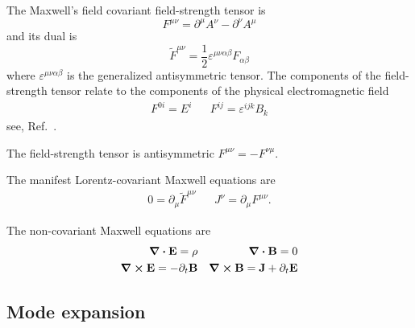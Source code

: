 \begin{definition}
	The Maxwell's field covariant field-strength tensor is
	\begin{equation}
		F^{\mu\nu}
		=
		\partial^\mu A^\nu
		-
		\partial^\nu A^\mu
	\end{equation}
	and its dual is
	\begin{equation}
		\tilde{F}^{\mu\nu}
		=
		\frac{1}{2}
		\varepsilon^{\mu\nu\alpha\beta}
		F_{\alpha\beta}
	\end{equation}
	where $\varepsilon^{\mu\nu\alpha\beta}$ is the generalized antisymmetric tensor.
	The components of the field-strength tensor relate to the components of the physical electromagnetic field
	\begin{align}
		F^{0i}
		=
		E^i
		&&
		F^{ij}
		=
		\varepsilon^{ijk}B_k
		\label{eq:mw_field_strength_components}
	\end{align}
	see, Ref.~\cite[p.~336]{Srednicki2007}.
\end{definition}
\begin{lemma}\label{thm:mw_field_strength_antisymmetry}
	The field-strength tensor is antisymmetric $F^{\mu\nu}=-F^{\nu\mu}$.
\end{lemma}
\begin{theorem}\label{thm:covariant_maxwell_equations}
	The manifest Lorentz-covariant Maxwell equations are
	\begin{align}
		0
		=
		\partial_\mu
		\tilde{F}^{\mu\nu}
		&&
		J^\nu
		=
		\partial_\mu
		F^{\mu\nu}
		.
	\end{align}
\end{theorem}
\begin{theorem}\label{thm:non_covarain_maxwell_equations}
	The non-covariant Maxwell equations are
	\begin{align}
		\div\vb{E}
		=
		\rho
		&&
		\div\vb{B}
		=
		0
		\label{eq:mw_homo_vec}
		\\
		\curl\vb{E}
		=
		-
		\partial_t\vb{B}
		&&
		\curl\vb{B}
		=
		\vb{J}
		+
		\partial_t\vb{E}
		\label{eq:mw_inhomo_vec}
	\end{align}
\end{theorem}

\subsection{Mode expansion}

